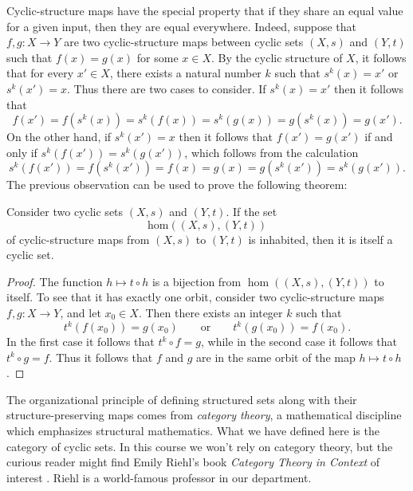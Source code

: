 Cyclic-structure maps have the special property that if they share an equal value for a given input, then they are equal everywhere. Indeed, suppose that $f,g:X\to Y$ are two cyclic-structure maps between cyclic sets $(X,s)$ and $(Y,t)$ such that $f(x)=g(x)$ for some $x\in X$. By the cyclic structure of $X$, it follows that for every $x'\in X$, there exists a natural number $k$ such that $s^k(x)=x'$ or $s^k(x')=x$. Thus there are two cases to consider. If $s^k(x)=x'$ then it follows that
\begin{equation*}
  f(x')=f(s^k(x))=s^k(f(x))=s^k(g(x))=g(s^k(x))=g(x').
\end{equation*}
On the other hand, if $s^k(x')=x$ then it follows that $f(x')=g(x')$ if and only if $s^k(f(x'))=s^k(g(x'))$, which follows from the calculation
\begin{equation*}
  s^k(f(x'))=f(s^k(x'))=f(x)=g(x)=g(s^k(x'))=s^k(g(x')).
\end{equation*}
The previous observation can be used to prove the following theorem:

\begin{theorem}
  Consider two cyclic sets $(X,s)$ and $(Y,t)$. If the set
  \begin{equation*}
    \mathrm{hom}((X,s),(Y,t))
  \end{equation*}
  of cyclic-structure maps from $(X,s)$ to $(Y,t)$ is inhabited, then it is itself a cyclic set.
\end{theorem}

\begin{proof}
  The function $h\mapsto t\circ h$ is a bijection from $\hom((X,s),(Y,t))$ to itself. To see that it has exactly one orbit, consider two cyclic-structure maps $f,g:X\to Y$, and let $x_0\in X$. Then there exists an integer $k$ such that
  \begin{equation*}
    t^k(f(x_0))=g(x_0)\qquad\text{or}\qquad t^k(g(x_0))=f(x_0).
  \end{equation*}
  In the first case it follows that $t^k\circ f=g$, while in the second case it follows that $t^k\circ g=f$. Thus it follows that $f$ and $g$ are in the same orbit of the map $h\mapsto t\circ h$.
\end{proof}

The organizational principle of defining structured sets along with their structure-preserving maps comes from \emph{category theory}, a mathematical discipline which emphasizes structural mathematics. What we have defined here is the category of cyclic sets. In this course we won't rely on category theory, but the curious reader might find Emily Riehl's book \emph{Category Theory in Context} of interest \cite{riehl2016}. Riehl is a world-famous professor in our department.

